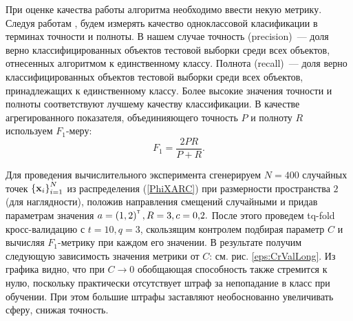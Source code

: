 

При оценке качества работы алгоритма необходимо ввести некую метрику. 
Следуя работам  \cite{}, будем измерять качество одноклассовой класификации в терминах точности и полноты. 
В нашем случае точность (precision)~--- доля верно классифицированных объектов тестовой выборки среди всех объектов, отнесенных алгоритмом к единственному классу. Полнота (recall)~--- доля верно классифицированных объектов тестовой выборки среди всех объектов, принадлежащих к единственному классу. Более высокие значения точности и полноты соответствуют лучшему качеству классификации. В качестве агрегированного показателя, объединияющего точность $P$ и полноту $R$ используем $F_1$-меру:
$$F_1 = \frac{2PR}{P+R}.$$

Для проведения вычислительного эксперимента сгенерируем $N=400$ случайных точек $\left\{\boldsymbol{\mathbf{x}}_i\right\}_{i=1}^N$ из распределения (\ref{PhiXARC}) при размерности пространства $2$ (для наглядности), положив направления смещений случайными и придав параметрам значения $a = \left(1,2\right)^{\text{\tiny\sffamily\upshape\mdseries T}}, R = 3, c = 0{,}2.$
После этого проведем tq-fold кросс-валидацию с $t = 10, q = 3$, скользящим контролем подбирая параметр $C$ и вычисляя $F_1$-метрику при каждом его значении. В результате получим следующую зависимость значения метрики от $C$: см. рис. \ref{eps:CrValLong}.
Из графика видно, что при $C\to 0$ обобщающая способность также стремится к нулю, поскольку практически отсутствует штраф за непопадание в класс при обучении. При этом большие штрафы заставляют необоснованно увеличивать сферу, снижая точность.

